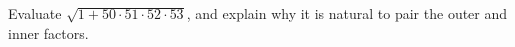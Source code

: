 Evaluate $\sqrt{1+50\cdot51\cdot52\cdot53}$, and explain why it is natural to pair the outer and inner factors.
